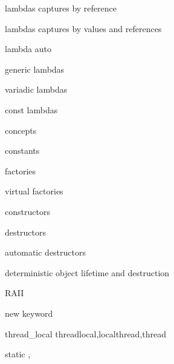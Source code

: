          lambdas captures by reference 
        
         lambdas captures by values and references 
        
         lambda auto
        
         generic lambdas
        
         variadic lambdas 
        
         const lambdas 
        
         concepts 
        
         constants 
        
         factories 
        
         virtual factories 
        
         constructors 
        
         destructors
        
         automatic destructors 
        
         deterministic object lifetime and destruction
        
         RAII 
        
         new keyword 
        
         thread_local
        threadlocal,localthread,thread
        
         static ,
        
